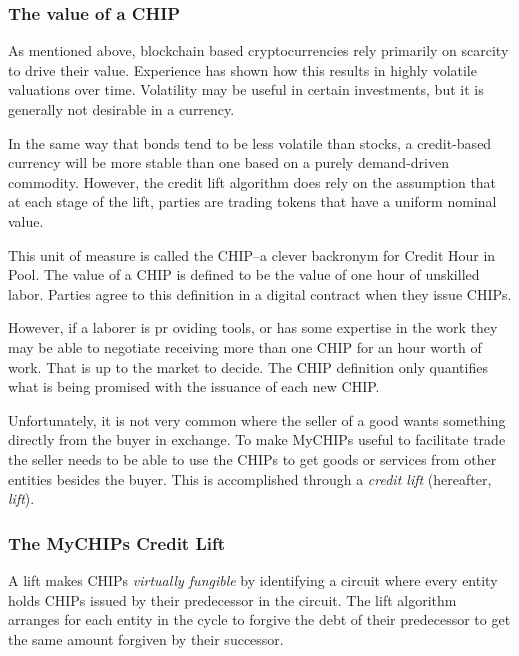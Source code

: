 \documentclass[runningheads]{llncs}
\begin{document}
\subsubsection{The value of a CHIP}
As mentioned above, blockchain based cryptocurrencies rely primarily on scarcity to drive their value.
Experience has shown how this results in highly volatile valuations over time.
Volatility may be useful in certain investments, but it is generally not desirable in a currency.

In the same way that bonds tend to be less volatile than stocks, a credit-based currency will be more stable than one based on a purely demand-driven commodity.
However, the credit lift algorithm does rely on the assumption that at each stage of the lift, parties are trading tokens that have a uniform nominal value.

This unit of measure is called the CHIP--a clever backronym for Credit Hour in Pool.
The value of a CHIP is defined to be the value of one hour of unskilled labor. Parties agree to this definition in a digital contract when they issue CHIPs.

However, if a laborer is pr oviding tools, or has some expertise in the work they may be able to negotiate receiving more than one CHIP for an hour worth of work.
That is up to the market to decide.
The CHIP definition only quantifies what is being promised with the issuance of each new CHIP.

Unfortunately, it is not very common where the seller of a good wants something directly from the buyer in exchange. To make MyCHIPs useful to facilitate trade the seller needs to be able to use the CHIPs to get goods or services from other entities besides the buyer. This is accomplished through a \emph{credit lift} (hereafter, \emph{lift}).

\subsubsection{The MyCHIPs Credit Lift}
A lift makes CHIPs \emph{virtually fungible} by identifying a circuit where every entity holds CHIPs issued by their predecessor in the circuit. The lift algorithm arranges for each entity in the cycle to forgive the debt of their predecessor to get the same amount forgiven by their successor. 
 
\end{document}
